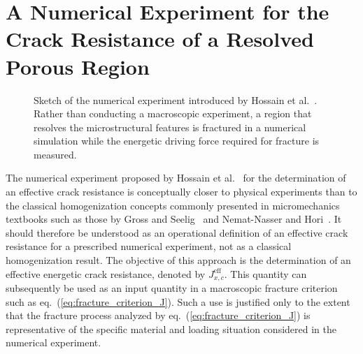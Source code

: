 \documentclass[pdflatex,sn-mathphys-num]{sn-jnl}%
\theoremstyle{thmstyleone}%
\theoremstyle{thmstyletwo}%
\theoremstyle{thmstylethree}%
\begin{document}
\section{\texorpdfstring{A Numerical Experiment for the Crack Resistance of a Resolved Porous Region}{A Numerical Experiment for the Crack Resistance of a Resolved Porous Region}}
\label{sec:numericalExperiment}


\begin{figure}[htb]
    \centering
    \resizebox{0.6\textwidth}{!}{}
    \caption{%
        Sketch of the numerical experiment introduced by Hossain et al.~\cite{hossain_effective_2014}. 
        Rather than conducting a macroscopic experiment, a region that resolves the microstructural features is fractured in a numerical simulation while the energetic driving force required for fracture is measured.
    }
    \label{fig:numerical_experiment}
\end{figure}

The numerical experiment proposed by Hossain et al.~\cite{hossain_effective_2014} for the determination of an effective crack resistance is conceptually closer to physical experiments than to the classical homogenization concepts commonly presented in micromechanics textbooks such as those by Gross and Seelig~\cite{gross_fracture_2011} and Nemat-Nasser and Hori~\cite{nemat-nasser_micromechanics_2013}. 
It should therefore be understood as an operational definition of an effective crack resistance for a prescribed numerical experiment, not as a classical homogenization result.
The objective of this approach is the determination of an effective energetic crack resistance, denoted by $J_{x,c}^{\text{eff}}$. This quantity can subsequently be used as an input quantity in a macroscopic fracture criterion such as eq.~(\ref{eq:fracture_criterion_J}).
Such a use is justified only to the extent that the fracture process analyzed by eq.~(\ref{eq:fracture_criterion_J}) is representative of the specific material and loading situation considered in the numerical experiment.
\end{document}
